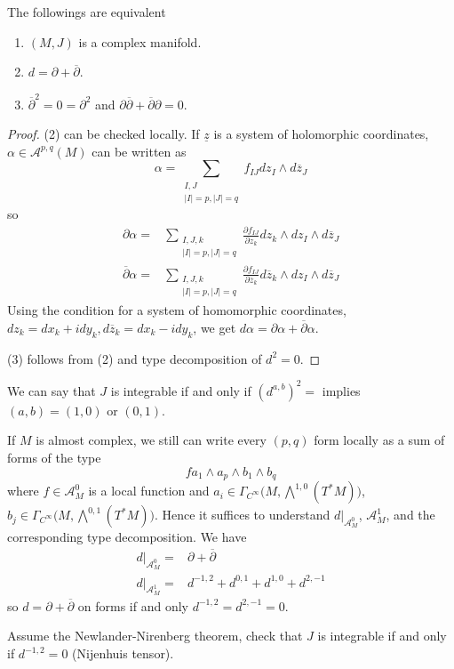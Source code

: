 \documentclass[
11pt, %
letterpaper， %
oneside, %
headinclude,footinclude, %
BCOR5mm, %
]{scrartcl}
\begin{document}
\begin{prop}The followings are equivalent
	\begin{enumerate}
		\item $(M,J)$ is a complex manifold.
		\item  $d=\partial+\overline{\partial}$.
		\item $\overline{\partial}^2=0=\partial^2$ and $\partial\overline{\partial}+\overline{\partial}\partial=0$.
	\end{enumerate}	
\end{prop}
\begin{proof}
	(2) can be checked locally. If $\underline{z}$ is a system of holomorphic coordinates, $\alpha \in \mathcal{A}^{p,q}(M)$ can be written as 
	\begin{equation*}
	\alpha=\sum_{\substack{I,J \\|I|=p, |J|=q}}f_{IJ}dz_I\wedge d\overline{z}_J
	\end{equation*}
	so 
	\begin{align*}
	\partial \alpha=&\sum_{\substack{I,J,k \\|I|=p, |J|=q}}\frac{\partial f_{IJ}}{\partial z_k} dz_k \wedge dz_I\wedge d\overline{z}_J \\
	\overline{\partial} \alpha=&\sum_{\substack{I,J,k \\|I|=p, |J|=q}}\frac{\partial f_{IJ}}{\partial \overline{z}_k}  d\overline{z}_k \wedge dz_I\wedge d\overline{z}_J
	\end{align*}
	Using the condition for a system of homomorphic coordinates, $dz_k=dx_k+idy_k, d\overline{z}_k=dx_k-idy_k$, we get  $d\alpha=\partial \alpha+  	\overline{\partial} \alpha$.
	
	(3) follows from (2) and type decomposition of $ d^2=0$.
\end{proof}

\begin{rem}We can say that $J$ is integrable if and only if $(d^{a,b})^2=$ implies $(a,b)=(1,0)$ or $(0,1)$. 
	\end{rem}
If $M$ is almost complex, we still can  write every $(p,q)$ form locally as a sum of forms of the type
\begin{equation*}
fa_1\wedge a_p\wedge b_1 \wedge b_q
\end{equation*}
where $f\in \mathcal{A}^0_M$ is a local function and $a_i\in \Gamma_{C^{\infty}}\big(M,\bigwedge^{1,0}(T^*M)\big)$, $b_j\in \Gamma_{C^{\infty}}\big(M,\bigwedge^{0,1}(T^*M)\big)$. Hence it suffices to understand $d|_{\mathcal{A}^0_M}$, $\mathcal{A}^1_M$, and the corresponding type decomposition. We have
\begin{align*}
d|_{\mathcal{A}^0_M}=& \partial+\overline{\partial}\\
d|_{\mathcal{A}^1_M}=&d^{-1,2}+d^{0,1}+d^{1,0}+d^{2,-1}
\end{align*}
so $d=\partial+\overline{\partial}$ on forms if and only $d^{-1,2}=d^{2,-1}=0$.
\begin{exercise}
	Assume the Newlander-Nirenberg theorem, check that $J$ is integrable if and only if $d^{-1,2}=0$ (Nijenhuis tensor).
\end{exercise}
\end{document}
